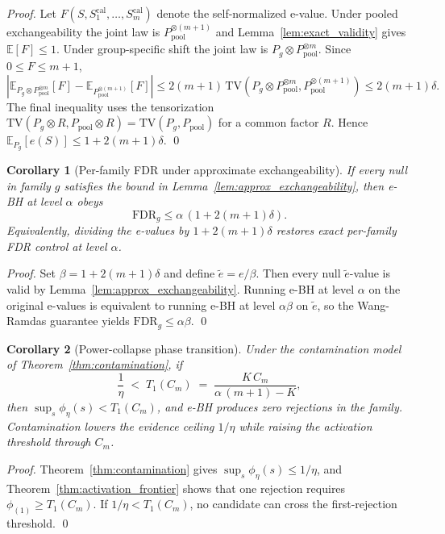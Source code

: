 \documentclass{article}
\newtheorem{corollary}{Corollary}
\theoremstyle{remark}
\newcommand{\E}{\mathbb{E}}
\newcommand{\1}{\mathbf{1}}
\begin{document}
\begin{proof}
Let $F(S,S_1^{\mathrm{cal}},\ldots,S_m^{\mathrm{cal}})$ denote the
self-normalized e-value. Under pooled exchangeability the joint law is
$P_{\mathrm{pool}}^{\otimes(m+1)}$ and Lemma~\ref{lem:exact_validity} gives
$\E[F]\le 1$. Under group-specific shift the joint law is
$P_g\otimes P_{\mathrm{pool}}^{\otimes m}$. Since $0\le F\le m+1$,
\[
\left|\E_{P_g\otimes P_{\mathrm{pool}}^{\otimes m}}[F]
-\E_{P_{\mathrm{pool}}^{\otimes(m+1)}}[F]\right|
\le 2(m+1)\,
\mathrm{TV}\!\left(P_g\otimes P_{\mathrm{pool}}^{\otimes m},
P_{\mathrm{pool}}^{\otimes(m+1)}\right)
\le 2(m+1)\delta.
\]
The final inequality uses the tensorization
$\mathrm{TV}(P_g\otimes R,P_{\mathrm{pool}}\otimes R)=\mathrm{TV}(P_g,P_{\mathrm{pool}})$
for a common factor $R$. Hence $\E_{P_g}[e(S)]\le 1+2(m+1)\delta$. \qed
\end{proof}

\begin{corollary}[Per-family FDR under approximate exchangeability]
\label{cor:approx_exchangeability}
If every null in family $g$ satisfies the bound in
Lemma~\ref{lem:approx_exchangeability}, then e-BH at level $\alpha$ obeys
\[
\mathrm{FDR}_g \le \alpha\,(1+2(m+1)\delta).
\]
Equivalently, dividing the e-values by $1+2(m+1)\delta$ restores exact
per-family FDR control at level $\alpha$.
\end{corollary}

\begin{proof}
Set $\beta=1+2(m+1)\delta$ and define $\tilde e=e/\beta$. Then every null
$\tilde e$-value is valid by Lemma~\ref{lem:approx_exchangeability}. Running
e-BH at level $\alpha$ on the original e-values is equivalent to running e-BH
at level $\alpha\beta$ on $\tilde e$, so the Wang-Ramdas guarantee yields
$\mathrm{FDR}_g \le \alpha\beta$. \qed
\end{proof}

\begin{corollary}[Power-collapse phase transition]
\label{cor:phase_transition}
Under the contamination model of Theorem~\ref{thm:contamination}, if
\[
\frac{1}{\eta}
\;<\;
T_1(C_m)
\;=\;
\frac{K\,C_m}{\alpha\,(m+1)-K},
\]
then $\sup_s\phi_\eta(s) < T_1(C_m)$, and e-BH produces zero rejections in the
family. Contamination lowers the evidence ceiling $1/\eta$ while raising the
activation threshold through $C_m$.
\end{corollary}

\begin{proof}
Theorem~\ref{thm:contamination} gives $\sup_s\phi_\eta(s)\le 1/\eta$, and
Theorem~\ref{thm:activation_frontier} shows that one rejection requires
$\phi_{(1)}\ge T_1(C_m)$. If $1/\eta<T_1(C_m)$, no candidate can cross the
first-rejection threshold. \qed
\end{proof}
\end{document}
